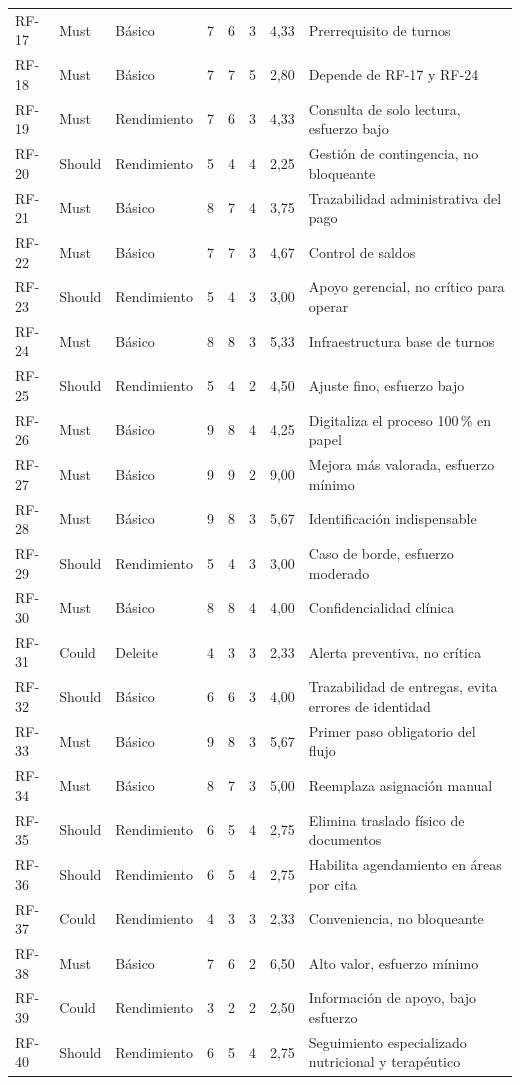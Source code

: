 \documentclass[11pt,a4paper]{article}
\begin{document}
\begin{longtable}{p{} p{} p{} p{} p{} p{} p{} p{}}
		RF-17 & Must    & Básico      & 7  & 6 & 3 & 4,33 & Prerrequisito de turnos \\
		RF-18 & Must    & Básico      & 7  & 7 & 5 & 2,80 & Depende de RF-17 y RF-24 \\
		RF-19 & Must    & Rendimiento & 7  & 6 & 3 & 4,33 & Consulta de solo lectura, esfuerzo bajo \\
		RF-20 & Should  & Rendimiento & 5  & 4 & 4 & 2,25 & Gestión de contingencia, no bloqueante \\
		RF-21 & Must    & Básico      & 8  & 7 & 4 & 3,75 & Trazabilidad administrativa del pago \\
		RF-22 & Must    & Básico      & 7  & 7 & 3 & 4,67 & Control de saldos \\
		RF-23 & Should  & Rendimiento & 5  & 4 & 3 & 3,00 & Apoyo gerencial, no crítico para operar \\
		RF-24 & Must    & Básico      & 8  & 8 & 3 & 5,33 & Infraestructura base de turnos \\
		RF-25 & Should  & Rendimiento & 5  & 4 & 2 & 4,50 & Ajuste fino, esfuerzo bajo \\
		RF-26 & Must    & Básico      & 9  & 8 & 4 & 4,25 & Digitaliza el proceso 100\,\% en papel \\
		RF-27 & Must    & Básico      & 9  & 9 & 2 & 9,00 & Mejora más valorada, esfuerzo mínimo \\
		RF-28 & Must    & Básico      & 9  & 8 & 3 & 5,67 & Identificación indispensable \\
		RF-29 & Should  & Rendimiento & 5  & 4 & 3 & 3,00 & Caso de borde, esfuerzo moderado \\
		RF-30 & Must    & Básico      & 8  & 8 & 4 & 4,00 & Confidencialidad clínica \\
		RF-31 & Could   & Deleite     & 4  & 3 & 3 & 2,33 & Alerta preventiva, no crítica \\
		RF-32 & Should  & Básico      & 6  & 6 & 3 & 4,00 & Trazabilidad de entregas, evita errores de identidad \\
		RF-33 & Must    & Básico      & 9  & 8 & 3 & 5,67 & Primer paso obligatorio del flujo \\
		RF-34 & Must    & Básico      & 8  & 7 & 3 & 5,00 & Reemplaza asignación manual \\
		RF-35 & Should  & Rendimiento & 6  & 5 & 4 & 2,75 & Elimina traslado físico de documentos \\
		RF-36 & Should  & Rendimiento & 6  & 5 & 4 & 2,75 & Habilita agendamiento en áreas por cita \\
		RF-37 & Could   & Rendimiento & 4  & 3 & 3 & 2,33 & Conveniencia, no bloqueante \\
		RF-38 & Must    & Básico      & 7  & 6 & 2 & 6,50 & Alto valor, esfuerzo mínimo \\
		RF-39 & Could   & Rendimiento & 3  & 2 & 2 & 2,50 & Información de apoyo, bajo esfuerzo \\
		RF-40 & Should  & Rendimiento & 6  & 5 & 4 & 2,75 & Seguimiento especializado nutricional y terapéutico \\
		

\end{longtable}
\end{document}
